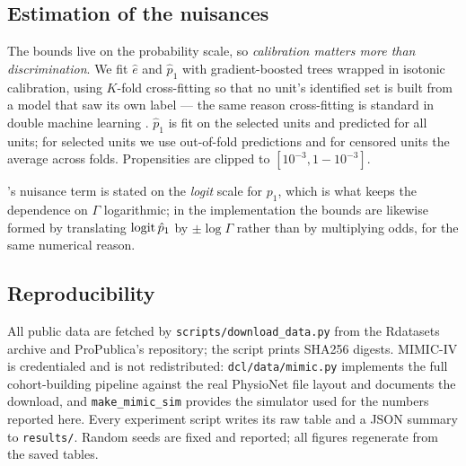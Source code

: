 \subsection{Estimation of the nuisances}
\label{app:nuisance-est}

The bounds live on the probability scale, so \emph{calibration matters more than
discrimination}. We fit $\hat e$ and $\hat p_1$ with gradient-boosted trees
wrapped in isotonic calibration, using $K$-fold cross-fitting so that no unit's
identified set is built from a model that saw its own label --- the same reason
cross-fitting is standard in double machine learning
\citep{chernozhukov2018double}. $\hat p_1$ is fit on the selected units and
predicted for all units; for selected units we use out-of-fold predictions and
for censored units the average across folds. Propensities are clipped to
$[10^{-3},1-10^{-3}]$.

's nuisance term is stated on the \emph{logit} scale for
$p_1$, which is what keeps the dependence on $\Gamma$ logarithmic; in the
implementation the bounds are likewise formed by translating
$\operatorname{logit}\hat p_1$ by $\pm\log\Gamma$ rather than by multiplying odds, for the same
numerical reason.

\subsection{Reproducibility}
\label{app:repro}

All public data are fetched by \texttt{scripts/download\_data.py} from the
Rdatasets archive and ProPublica's repository; the script prints SHA256 digests.
MIMIC-IV is credentialed and is not redistributed: \texttt{dcl/data/mimic.py}
implements the full cohort-building pipeline against the real PhysioNet file
layout and documents the download, and \texttt{make\_mimic\_sim} provides the
simulator used for the numbers reported here. Every experiment script writes its
raw table and a JSON summary to \texttt{results/}. Random seeds are fixed and
reported; all figures regenerate from the saved tables.
